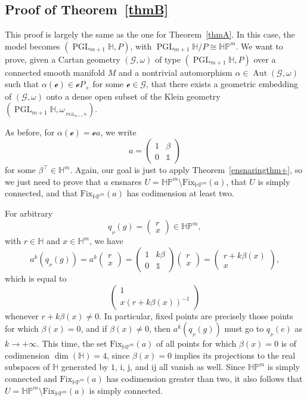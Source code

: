 \documentclass[10pt,a4paper]{amsart}
\numberwithin{equation}{section}
\theoremstyle{definition}
\DeclareMathOperator{\Aut}{\mathrm{Aut}}
\DeclareMathOperator{\PGL}{\mathrm{PGL}}
\newcommand{\MC}[1]{\omega_{{}_{#1}}}
\begin{document}
\subsection{Proof of Theorem~\ref{thmB}}
This proof is largely the same as the one for Theorem~\ref{thmA}. In this case, the model becomes $(\PGL_{m+1}\mathbb{H},P)$, with $\PGL_{m+1}\mathbb{H}/P\cong\mathbb{HP}^m$. We want to prove, given a Cartan geometry $(\mathscr{G},\omega)$ of type $(\PGL_{m+1}\mathbb{H},P)$ over a connected smooth manifold $M$ and a nontrivial automorphism $\alpha\in\Aut(\mathscr{G},\omega)$ such that $\alpha(\mathscr{e})\in\mathscr{e}P_+$ for some $\mathscr{e}\in\mathscr{G}$, that there exists a geometric embedding of $(\mathscr{G},\omega)$ onto a dense open subset of the Klein geometry $(\PGL_{m+1}\mathbb{H},\MC{\PGL_{m+1}\mathbb{H}})$.

As before, for $\alpha(\mathscr{e})=\mathscr{e}a$, we write \[a=\begin{pmatrix}1 & \beta \\ 0 & \mathds{1}\end{pmatrix}\] for some $\beta^\top\in\mathbb{H}^m$. Again, our goal is just to apply Theorem~\ref{ensnaringthm+}, so we just need to prove that $a$ ensnares $U=\mathbb{HP}^m\setminus\mathrm{Fix}_{\mathbb{HP}^m}(a)$, that $U$ is simply connected, and that $\mathrm{Fix}_{\mathbb{HP}^m}(a)$ has codimension at least two.

For arbitrary \[q_{{}_P}(g)=\begin{pmatrix}r \\ x\end{pmatrix}\in\mathbb{HP}^m,\] with $r\in\mathbb{H}$ and $x\in\mathbb{H}^m$, we have \[a^k(q_{{}_P}(g))=a^k\begin{pmatrix}r \\ x\end{pmatrix}=\begin{pmatrix}1 & k\beta \\ 0 & \mathds{1}\end{pmatrix}\begin{pmatrix}r \\ x\end{pmatrix}=\begin{pmatrix}r+k\beta(x) \\ x\end{pmatrix},\] which is equal to \[\begin{pmatrix}1 \\ x(r+k\beta(x))^{-1}\end{pmatrix}\] whenever $r+k\beta(x)\neq 0$. In particular, fixed points are precisely those points for which $\beta(x)=0$, and if $\beta(x)\neq 0$, then $a^k(q_{{}_P}(g))$ must go to $q_{{}_P}(e)$ as $k\rightarrow +\infty$. This time, the set $\mathrm{Fix}_{\mathbb{HP}^m}(a)$ of all points for which $\beta(x)=0$ is of codimension $\dim(\mathbb{H})=4$, since $\beta(x)=0$ implies its projections to the real subspaces of $\mathbb{H}$ generated by $1$, $\mathrm{i}$, $\mathrm{j}$, and $\mathrm{i}\mathrm{j}$ all vanish as well. Since $\mathbb{HP}^m$ is simply connected and $\mathrm{Fix}_{\mathbb{HP}^m}(a)$ has codimension greater than two, it also follows that $U=\mathbb{HP}^m\setminus\mathrm{Fix}_{\mathbb{HP}^m}(a)$ is simply connected.
\end{document}
